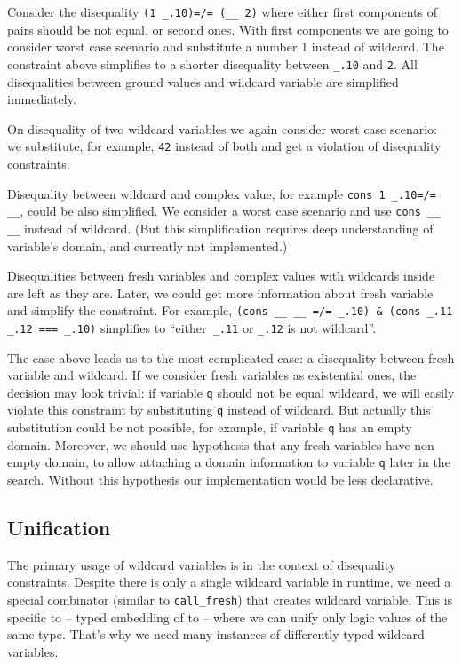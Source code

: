 Consider the disequality \lstinline|(1 _.10)=/= (__ 2)| where either first components of pairs should be not equal, or second ones. With first components we are going to consider worst case scenario and substitute a number 1 instead of wildcard. The constraint above simplifies to a shorter disequality between  \lstinline|_.10| and \lstinline|2|. All disequalities between ground values and wildcard variable are simplified immediately.

On disequality of two wildcard variables we again consider worst case scenario: we substitute, for example, \lstinline|42| instead of both and get a violation of disequality constraints.

Disequality between wildcard and complex value, for example  \lstinline|cons 1 _.10=/= __|, could be also simplified. We consider a worst case scenario and use \lstinline|cons __ __| instead of wildcard. (But this simplification requires deep understanding of variable's domain, and currently not implemented.)

Disequalities between fresh variables and complex values with wildcards inside are left as they are. Later, we could get more information  about fresh variable and simplify the constraint. For example,
 \lstinline|(cons __ __ =/= _.10) & (cons _.11 _.12 === _.10)| simplifies to ``either\lstinline| _.11|  or \lstinline|_.12| is not wildcard''.

The case above leads us to the most complicated case: a disequality between fresh variable and wildcard. If we consider fresh variables as existential ones, the decision may look trivial: if variable \lstinline|q| should not be equal wildcard, we will easily violate this constraint by substituting \lstinline|q| instead of wildcard. But actually this substitution could be not possible, for example, if variable \lstinline|q| has an empty domain. Moreover, we should use hypothesis that any fresh variables have non empty domain, to allow attaching a domain information to variable \lstinline|q| later in the search. Without this hypothesis our \miniKanren{} implementation would be less declarative.



\subsection{Unification}
The primary usage of wildcard variables is in the context of disequality constraints.
Despite there is only a single wildcard variable in runtime, we  need a special combinator (similar to \lstinline|call_fresh|) that creates wildcard variable.
This is specific to \OCanren{} -- typed embedding of \miniKanren{} to \OCaml{} -- where we can unify only logic values of the same type. That's why we need many instances of differently typed wildcard variables.

